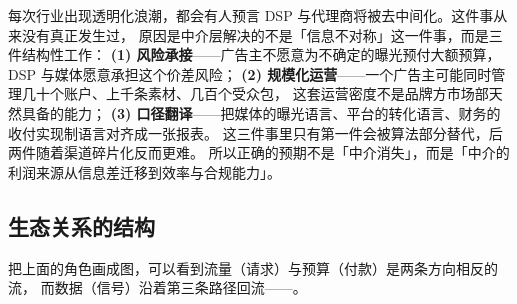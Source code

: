 \begin{insight}
每次行业出现透明化浪潮，都会有人预言 DSP 与代理商将被去中间化。这件事从来没有真正发生过，
原因是中介层解决的不是「信息不对称」这一件事，而是三件结构性工作：
\textbf{(1) 风险承接}——广告主不愿意为不确定的曝光预付大额预算，DSP 与媒体愿意承担这个价差风险；
\textbf{(2) 规模化运营}——一个广告主可能同时管理几十个账户、上千条素材、几百个受众包，
这套运营密度不是品牌方市场部天然具备的能力；
\textbf{(3) 口径翻译}——把媒体的曝光语言、平台的转化语言、财务的收付实现制语言对齐成一张报表。
这三件事里只有第一件会被算法部分替代，后两件随着渠道碎片化反而更难。
所以正确的预期不是「中介消失」，而是「中介的利润来源从信息差迁移到效率与合规能力」。
\end{insight}

\subsection{生态关系的结构}

把上面的角色画成图，可以看到流量（请求）与预算（付款）是两条方向相反的流，
而数据（信号）沿着第三条路径回流——。

